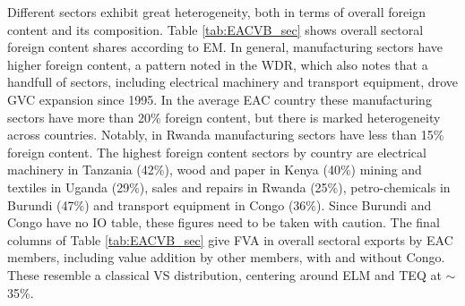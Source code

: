 \documentclass[a4paper]{article}
\begin{document}
Different sectors exhibit great heterogeneity, both in terms of overall foreign content and its composition. Table \ref{tab:EACVB_sec} shows overall sectoral foreign content shares according to EM. In general, manufacturing sectors have higher foreign content, a pattern noted in the WDR, which also notes that a handfull of sectors, including electrical machinery and transport equipment, drove GVC expansion since 1995. In the average EAC country these manufacturing sectors have more than 20\% foreign content, but there is marked heterogeneity across countries. Notably, in Rwanda manufacturing sectors have less than 15\% foreign content. The highest foreign content sectors by country are electrical machinery in Tanzania (42\%), wood and paper in Kenya (40\%) mining and textiles in Uganda (29\%), sales and repairs in Rwanda (25\%), petro-chemicals in Burundi (47\%) and transport equipment in Congo (36\%). Since Burundi and Congo have no IO table, these figures need to be taken with caution. The final columns of Table \ref{tab:EACVB_sec} give FVA in overall sectoral exports by EAC members, including value addition by other members, with and without Congo. These resemble a classical VS distribution, centering around ELM and TEQ at $\sim$ 35\%. 

\end{document}
